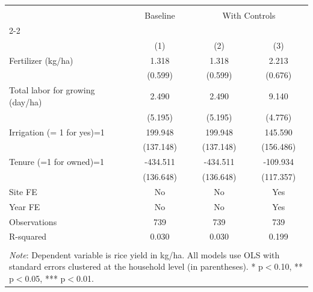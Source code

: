 \begin{tabular}{l*{3}{c}} \\[-1.8ex]\hline \hline \\[-1.8ex] 
& \multicolumn{1}{c}{Baseline} & \multicolumn{2}{c}{With Controls} \\ 
\cline{2-2} \cline{3-4} \\[-1.8ex] 
& \multicolumn{1}{c}{(1)} & \multicolumn{1}{c}{(2)} 
& \multicolumn{1}{c}{(3)} \\ 
\midrule
Fertilizer (kg/ha)  &       1.318\sym{**} &       1.318\sym{**} &       2.213\sym{***}\\
                    &     (0.599)         &     (0.599)         &     (0.676)         \\
Total labor for growing (day/ha)&       2.490         &       2.490         &       9.140\sym{*}  \\
                    &     (5.195)         &     (5.195)         &     (4.776)         \\
Irrigation (= 1 for yes)=1&     199.948         &     199.948         &     145.590         \\
                    &   (137.148)         &   (137.148)         &   (156.486)         \\
Tenure (=1 for owned)=1&    -434.511\sym{***}&    -434.511\sym{***}&    -109.934         \\
                    &   (136.648)         &   (136.648)         &   (117.357)         \\
Site FE             &          No         &          No         &         Yes         \\
Year FE             &          No         &          No         &         Yes         \\
\midrule
Observations        &         739         &         739         &         739         \\
R-squared           &       0.030         &       0.030         &       0.199         \\
\hline \hline \\[-1.8ex] 
\multicolumn{4}{p{0.8\linewidth}}{\small 
\noindent \textit{Note}: Dependent variable 
is rice yield in kg/ha. All models use 
OLS with standard errors clustered at the 
household level (in parentheses). 
* p$<$0.10, ** p$<$0.05, *** p$<$0.01.} 
\end{tabular}
